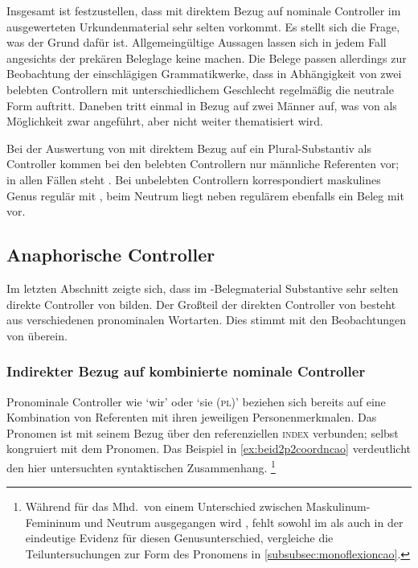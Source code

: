 Insgesamt ist festzustellen, dass  mit direktem Bezug auf
nominale Controller im ausgewerteten Urkundenmaterial sehr selten vorkommt. Es
stellt sich die Frage, was der Grund dafür ist. Allgemeingültige Aussagen
lassen sich in jedem Fall angesichts der prekären Beleglage keine machen. Die
Belege passen allerdings zur Beobachtung der einschlägigen Grammatikwerke, dass
in Abhängigkeit von zwei belebten Controllern mit unterschiedlichem Geschlecht
regelmäßig die neutrale Form  auftritt. Daneben tritt
 einmal in Bezug auf zwei Männer auf, was von
\textcite[384]{paul2007} als Möglichkeit zwar angeführt, aber nicht weiter
thematisiert wird.

Bei der Auswertung von  mit direktem Bezug auf ein
Plural-Substantiv als Controller kommen bei den belebten Controllern nur
männliche Referenten vor; in allen Fällen steht . Bei unbelebten
Controllern korrespondiert maskulines Genus regulär mit , beim
Neutrum liegt neben regulärem  ebenfalls ein Beleg mit
 vor.

\subsection{Anaphorische Controller}
\label{subsec:refctrl}

Im letzten Abschnitt zeigte sich, dass im \CAO{}-Belegmaterial
Substantive sehr selten direkte Controller von  bilden. Der
Großteil der direkten Controller von  besteht aus verschiedenen
pronominalen Wortarten.
Dies stimmt mit den Beobachtungen von \citet[624--625]{ksw2} überein.

\subsubsection{Indirekter Bezug auf kombinierte nominale Controller}
\label{subsubsec:beid2p2coordncao}

Pronominale Controller wie `wir' oder `sie (\textsc{pl})' beziehen sich
bereits auf eine Kombination von Referenten mit ihren jeweiligen
Personenmerkmalen. Das Pronomen ist mit seinem Bezug über den referenziellen
\textsc{index} verbunden;  selbst kongruiert mit dem Pronomen. Das
Beispiel in \cref{ex:beid2p2coordncao} verdeutlicht den hier untersuchten
syntaktischen Zusammenhang.%
%
	\footnote{Während für das  Mhd.\ von einem Unterschied
		zwischen Maskulinum-Femininum  und Neutrum 
		ausgegangen wird \autocites[vgl.][213--214]{paul2007}[369,
		390--397]{ksw2}, fehlt sowohl im \CAO{} als auch in der
		\KC{} eindeutige Evidenz für diesen Genusunterschied, vergleiche
		die Teiluntersuchungen zur Form des Pronomens in
		\cref{subsubsec:monoflexioncao}.}

